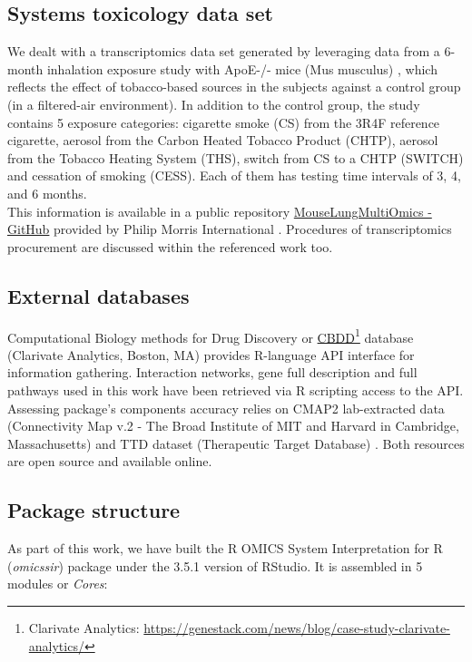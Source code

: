 \subsection{Systems toxicology data set}
We dealt with a transcriptomics data set generated by leveraging data from a 6-month inhalation exposure study with ApoE-/- mice (Mus musculus) \cite{LoSasso2016TheReduction} \cite{Phillips2016AnCigarettes}, which reflects the effect of tobacco-based sources in the subjects against a control group (in a filtered-air environment). In addition to the control group, the study contains 5 exposure categories: cigarette smoke (CS) from the 3R4F reference cigarette, aerosol from the Carbon Heated Tobacco Product (CHTP), aerosol from the Tobacco Heating System (THS), switch from CS to a CHTP (SWITCH) and cessation of smoking (CESS). Each of them has testing time intervals of 3, 4, and 6 months.
\\

This information is available in a public repository \href{https://github.com/philipmorrisintl/MouseLungMultiOmics}{MouseLungMultiOmics - GitHub} provided by Philip Morris International \cite{Titz2020Multi-omicsSmoke}. Procedures of transcriptomics procurement are discussed within the referenced work too.
\\

\subsection{External databases}
\label{section:external-db}
Computational Biology methods for Drug Discovery or \href{https://genestack.com/news/blog/case-study-clarivate-analytics/}{CBDD}\footnote{Clarivate Analytics: \url{https://genestack.com/news/blog/case-study-clarivate-analytics/}} database (Clarivate Analytics, Boston, MA) provides R-language API interface for information gathering. Interaction networks, gene full description and full pathways used in this work have been retrieved via R scripting access to the API.
\\

Assessing package’s components accuracy relies on CMAP2 lab-extracted data (Connectivity Map v.2 - The Broad Institute of MIT and Harvard in Cambridge, Massachusetts) \cite{Subramanian2017AProfiles} and TTD dataset (Therapeutic Target Database) \cite{Wang2020TherapeuticTherapeutics}.
Both resources are open source and available online.
\\

\subsection{Package structure}
As part of this work, we have built the R OMICS System Interpretation for R (\textit{omicssir}) package under the 3.5.1 version of RStudio. It is assembled in 5 modules or \textit{Cores}:
\\

